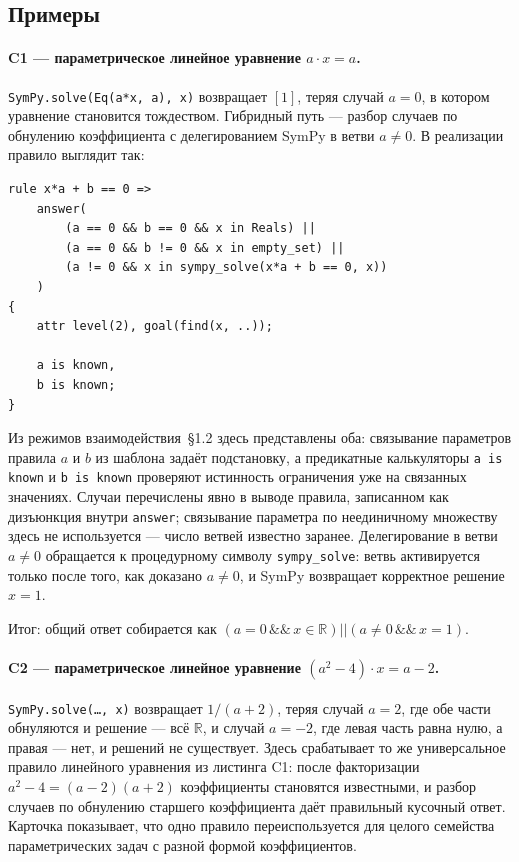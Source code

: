 \documentclass{intsys}
\begin{document}
\subsection{Примеры}

\paragraph{C1 --- параметрическое линейное уравнение
$a \cdot x = a$.} \texttt{SymPy.solve(Eq(a*x, a), x)} возвращает
$[1]$, теряя случай $a = 0$, в котором уравнение становится
тождеством. Гибридный путь --- разбор случаев по обнулению
коэффициента с делегированием SymPy в ветви $a \neq 0$.
В реализации правило выглядит так:

\begin{lstlisting}
rule x*a + b == 0 =>
    answer(
        (a == 0 && b == 0 && x in Reals) ||
        (a == 0 && b != 0 && x in empty_set) ||
        (a != 0 && x in sympy_solve(x*a + b == 0, x))
    )
{
    attr level(2), goal(find(x, ..));

    a is known,
    b is known;
}
\end{lstlisting}

Из режимов взаимодействия~\S1.2 здесь представлены оба: связывание
параметров правила $a$ и $b$ из шаблона задаёт подстановку, а
предикатные калькуляторы \texttt{a is known} и \texttt{b is known}
проверяют истинность ограничения уже на связанных значениях. Случаи
перечислены явно в выводе правила, записанном как дизъюнкция внутри
\texttt{answer}; связывание параметра по неединичному множеству
здесь не используется --- число ветвей известно заранее.
Делегирование в ветви $a \neq 0$
обращается к процедурному символу \texttt{sympy\_solve}: ветвь
активируется только после того, как доказано $a \neq 0$, и SymPy
возвращает корректное решение $x = 1$.

Итог: общий ответ собирается как
$(a = 0 \,\&\&\, x \in \mathbb{R}) \mathrel{||} (a \neq 0 \,\&\&\,
x = 1)$.

\paragraph{C2 --- параметрическое линейное уравнение
$(a^2 - 4) \cdot x = a - 2$.} \texttt{SymPy.solve(\ldots, x)} возвращает
$1/(a + 2)$, теряя случай $a = 2$, где обе части обнуляются и
решение --- всё $\mathbb{R}$, и случай $a = -2$, где левая часть
равна нулю, а правая --- нет, и решений не существует. Здесь
срабатывает то же универсальное правило линейного уравнения из
листинга C1: после факторизации $a^2 - 4 = (a-2)(a+2)$ коэффициенты
становятся известными, и разбор случаев по обнулению старшего
коэффициента даёт правильный кусочный ответ. Карточка показывает,
что одно правило переиспользуется для целого семейства
параметрических задач с разной формой коэффициентов.
\end{document}
